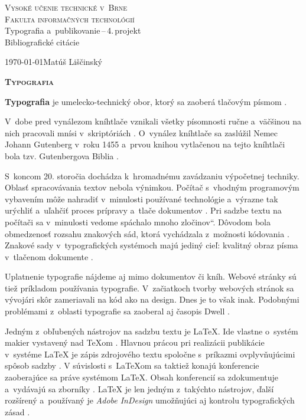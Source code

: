 \documentclass[11pt,a4paper,titlepage]{article}
\newcommand{\myuv}[1]{\quotedblbase #1\textquotedblleft}
\begin{document}
\begin{titlepage}
\begin{center}
{\Huge\textsc{Vysoké učenie technické v~Brne}}\\
\medskip
{\huge\textsc{Fakulta informačných technológií}}\\
{\LARGE Typografia a~publikovanie\,--\,4.\,projekt}\\
\medskip
{\Huge Bibliografické citácie}\\
\end{center}

{\Large\today \hfill Matúš Liščinský}
\end{titlepage}

\begin{center}
\textbf{\textsc{\Huge{Typografia}}}
\end{center}

\par 
\textbf{Typografia} je umelecko-technický obor, ktorý sa zaoberá tlačovým písmom \cite{Wiki:Typografie}.

V~dobe pred vynálezom kníhtlače vznikali všetky písomnosti ručne a~väčšinou na nich pracovali mnísi v~skriptóriách \cite{History_of_Typography}. 
O~vynález kníhtlače sa zaslúžil Nemec Johann Gutenberg v~roku 1455 a~prvou knihou vytlačenou na tejto kníhtlači bola tzv. Gutenbergova Biblia \cite{Cin_Magazine}.

S~koncom 20. storočia dochádza k~hromadnému zavádzaniu výpočetnej techniky. Oblasť spracováva\-nia textov nebola výnimkou. Počítač s~vhodným programovým vybavením môže nahradiť v~minulosti
používané technológie a~výrazne tak urýchliť a~uľahčiť proces prípravy a~tlače dokumentov \cite{Uhrik:Bakalar}.
Pri sadzbe textu na počítači sa v~minulosti vedome spáchalo mnoho \myuv{zločinov}. Dôvodom bola obmedzenosť rozsahu
znakových sád, ktorá vychádzala z~možnosti kódovania \cite{Jak_psat}. Znakové sady v~typografických systémoch majú jediný cieľ: kvalitný obraz písma v~tlačenom dokumente \cite{Cerny:Znakove_sady}.

Uplatnenie typografie nájdeme aj mimo dokumentov či kníh. Webové stránky sú tiež príkladom používania typografie. 
V~začiatkoch tvorby webových stránok sa vývojári skôr zameriavali na kód ako na design. Dnes je to však inak. Podobnými problémami z~oblasti typografie sa zaoberal aj časopis Dwell \cite{Dwell}.

Jedným z~obľubených nástrojov na sadzbu textu je \LaTeX{}. Ide vlastne o~systém makier vystavený nad \TeX{}om \cite{Martinek_Latex}. Hlavnou prácou  pri realizácii publikácie v~systéme \LaTeX{} je zápis zdrojového textu spoločne s~príkazmi ovplyvňujúcimi spôsob sadzby \cite{Rybicka:Latex}. V súvislosti s~\LaTeX{}om sa taktiež konajú konferencie zaoberajúce sa práve systémom \LaTeX{}. Obsah konferencií sa zdokumentuje a~vydávajú sa zborníky \cite{Konferencia}. \LaTeX{} je len jedným z~takýchto nástrojov, ďalší rozšírený a~používaný je \textit{Adobe InDesign} umožňujúci aj kontrolu typografických zásad \cite{Kubova_Adobe}.

\newpage
\renewcommand{\refname}{Referencie}

\end{document}
